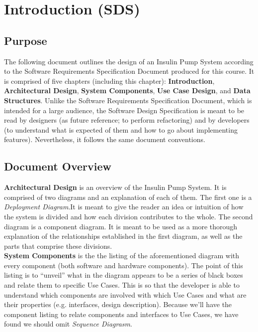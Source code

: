 \documentclass{scrreprt}
\begin{document}
\chapter{Introduction (SDS)}
\section{Purpose}
The following document outlines the design of an Insulin Pump System according to the Software Requirements Specification Document produced for this course. It is comprised of five chapters (including this chapter):
\textbf{Introduction}, \textbf{Architectural Design}, \textbf{System Components}, \textbf{Use Case Design}, and \textbf{Data Structures}. Unlike the Software Requirements Specification Document, which is intended for a
large audience, the Software Design Specification is meant to be read by designers (as future reference; to perform refactoring) and by developers (to understand what is expected of them and how to go about 
implementing features). Nevertheless, it follows the same document conventions.\\

\section{Document Overview}
\textbf{Architectural Design} is an overview of the Insulin Pump System. It is comprised of two diagrams and an explanation of each of them. The first one is a \textsl{Deployment Diagram}.It is meant to give the reader an 
idea or intuition of how the system is divided and how each division contributes to the whole. The second diagram is a component diagram. It is meant to be used as a more thorough explanation of the relationships 
established in the first diagram, as well as the parts that comprise these divisions.\\

\textbf{System Components} is the the listing of the aforementioned diagram with every component (both software and hardware components). The point of this listing is to “unveil” what in the diagram appears to be a series 
of black boxes and relate them to specific Use Cases. This is so that the developer is able to understand which components are involved with which Use Cases and what are 
their properties (e.g. interfaces, design description). Because we'll have the component listing to relate components and interfaces to Use Cases, we have found we should omit \textsl{Sequence Diagrasm}.\\
\end{document}
